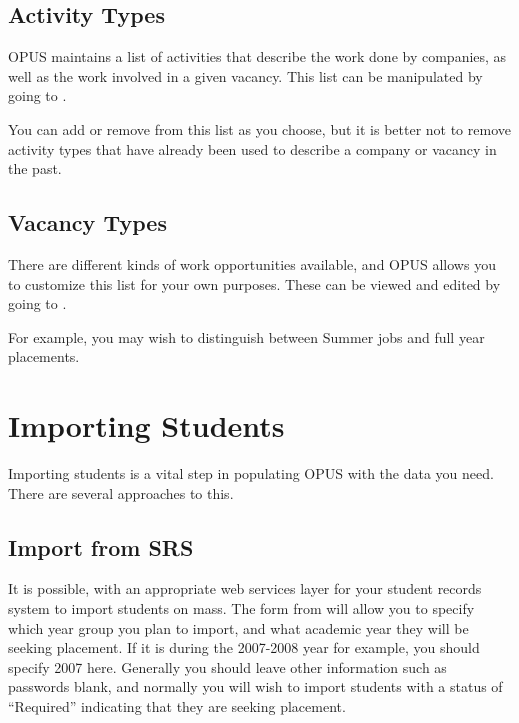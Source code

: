 \documentclass[12 pt]{book}
\begin{document}
\section{Activity Types}
\label{ActivityTypes}

OPUS maintains a list of activities that describe the work done by companies,
as well as the work involved in a given vacancy. This list can be manipulated
by going to .

You can add or remove from this list as you choose, but it is better not to
remove activity types that have already been used to describe a company or
vacancy in the past.

\section{Vacancy Types}
\label{VacancyTypes}

There are different kinds of work opportunities available, and OPUS allows you
to customize this list for your own purposes. These can be viewed and edited
by going to .

For example, you may wish to distinguish between Summer jobs and full year
placements.


\chapter{Importing Students}

Importing students is a vital step in populating OPUS with the data you need. There are several
approaches to this.

\section{Import from SRS}

It is possible, with an appropriate web services layer for your student records system to import
students on mass. The form from  will allow
you to specify which year group you plan to import, and what academic year they will be seeking
placement. If it is during the 2007-2008 year for example, you should specify 2007 here. Generally
you should leave other information such as passwords blank, and normally you will wish to
import students with a status of ``Required'' indicating that they are seeking placement.
\end{document}
